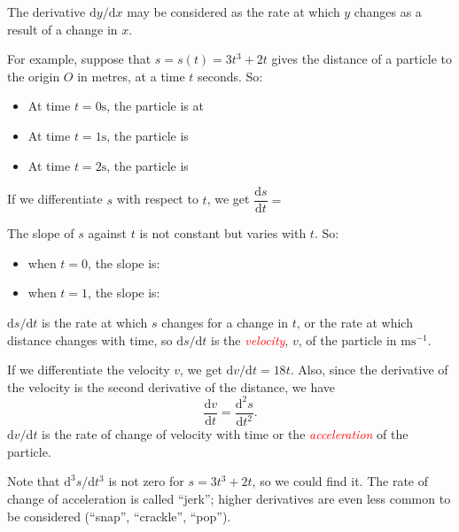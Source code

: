 \documentclass[
  11pt,
  oneside]{book}
\providecommand{\tightlist}{%
  \setlength{\itemsep}{0pt}\setlength{\parskip}{0pt}}
\newcommand{\slide}{}
\theoremstyle{definition}
\theoremstyle{definition}
\theoremstyle{definition}
\theoremstyle{definition}
\theoremstyle{remark}
\begin{document}
\begin{slidesonly}

The derivative \(\mathrm{d}y/\mathrm{d} x\) may be considered as the rate at which \(y\) changes as a result of a change in \(x\).

For example, suppose that \(s=s(t)=3t^3 + 2t\) gives the distance of a particle to the origin \(O\) in metres, at a time \(t\) seconds. So:

\begin{itemize}
\tightlist
\item
  At time \(t = 0\text{s}\), the particle is at
\item
  At time \(t = 1\text{s}\), the particle is
\item
  At time \(t = 2\text{s}\), the particle is
\end{itemize}

If we differentiate \(s\) with respect to \(t\), we get \(\dfrac{\mathrm{d} s}{\mathrm{d} t} =\)

The slope of \(s\) against \(t\) is not constant but varies with \(t\). So:

\begin{itemize}
\tightlist
\item
  when \(t = 0\), the slope is:
\item
  when \(t = 1\), the slope is:
\end{itemize}

\end{slidesonly}

\slide

\(\mathrm{d} s/\mathrm{d} t\) is the rate at which \(s\) changes for a change in \(t\), or the rate at which distance changes with time, so \(\mathrm{d} s/\mathrm{d} t\) is the \textcolor{red}{\em velocity}, \(v\), of the particle in \(\text{m}\text{s}^{-1}\).

If we differentiate the velocity \(v\), we get \(\mathrm{d} v/\mathrm{d} t = 18t\). Also, since the derivative of the velocity is the second derivative of the distance, we have
\[
\frac{\mathrm{d} v}{\mathrm{d} t}= \frac{\mathrm{d}^{2}s}{\mathrm{d}t^2}.
\]
\(\mathrm{d} v/\mathrm{d} t\) is the rate of change of velocity with time or the \textcolor{red}{\em acceleration} of the particle.

Note that \(\mathrm{d}^{3}s/\mathrm{d} t^{3}\) is not zero for \(s = 3t^3 + 2t\), so we could find it. The rate of change of acceleration is called ``jerk''; higher derivatives are even less common to be considered (``snap'', ``crackle'', ``pop'').
\slide
\end{document}
